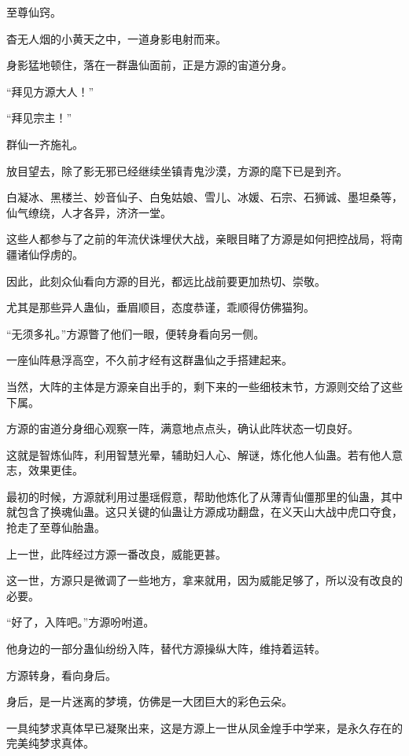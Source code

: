 
\begin{this_body}



至尊仙窍。

杳无人烟的小黄天之中，一道身影电射而来。

身影猛地顿住，落在一群蛊仙面前，正是方源的宙道分身。

“拜见方源大人！”

“拜见宗主！”

群仙一齐施礼。

放目望去，除了影无邪已经继续坐镇青鬼沙漠，方源的麾下已是到齐。

白凝冰、黑楼兰、妙音仙子、白兔姑娘、雪儿、冰媛、石宗、石狮诚、墨坦桑等，仙气缭绕，人才各异，济济一堂。

这些人都参与了之前的年流伏诛埋伏大战，亲眼目睹了方源是如何把控战局，将南疆诸仙俘虏的。

因此，此刻众仙看向方源的目光，都远比战前要更加热切、崇敬。

尤其是那些异人蛊仙，垂眉顺目，态度恭谨，乖顺得仿佛猫狗。

“无须多礼。”方源瞥了他们一眼，便转身看向另一侧。

一座仙阵悬浮高空，不久前才经有这群蛊仙之手搭建起来。

当然，大阵的主体是方源亲自出手的，剩下来的一些细枝末节，方源则交给了这些下属。

方源的宙道分身细心观察一阵，满意地点点头，确认此阵状态一切良好。

这就是智炼仙阵，利用智慧光晕，辅助妇人心、解谜，炼化他人仙蛊。若有他人意志，效果更佳。

最初的时候，方源就利用过墨瑶假意，帮助他炼化了从薄青仙僵那里的仙蛊，其中就包含了换魂仙蛊。这只关键的仙蛊让方源成功翻盘，在义天山大战中虎口夺食，抢走了至尊仙胎蛊。

上一世，此阵经过方源一番改良，威能更甚。

这一世，方源只是微调了一些地方，拿来就用，因为威能足够了，所以没有改良的必要。

“好了，入阵吧。”方源吩咐道。

他身边的一部分蛊仙纷纷入阵，替代方源操纵大阵，维持着运转。

方源转身，看向身后。

身后，是一片迷离的梦境，仿佛是一大团巨大的彩色云朵。

一具纯梦求真体早已凝聚出来，这是方源上一世从凤金煌手中学来，是永久存在的完美纯梦求真体。


\end{this_body}
